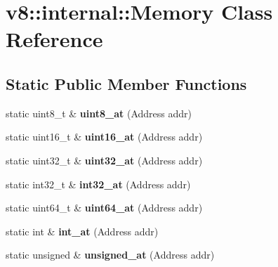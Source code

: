 \hypertarget{classv8_1_1internal_1_1_memory}{}\section{v8\+:\+:internal\+:\+:Memory Class Reference}
\label{classv8_1_1internal_1_1_memory}
\subsection*{Static Public Member Functions}
\begin{DoxyCompactItemize}
\item 
static uint8\+\_\+t \& {\bfseries uint8\+\_\+at} (Address addr)\hypertarget{classv8_1_1internal_1_1_memory_a22140801e40726e0a1765beb9c1b3718}{}\label{classv8_1_1internal_1_1_memory_a22140801e40726e0a1765beb9c1b3718}

\item 
static uint16\+\_\+t \& {\bfseries uint16\+\_\+at} (Address addr)\hypertarget{classv8_1_1internal_1_1_memory_a9a476e9ae1f102bec01a053fac6adce0}{}\label{classv8_1_1internal_1_1_memory_a9a476e9ae1f102bec01a053fac6adce0}

\item 
static uint32\+\_\+t \& {\bfseries uint32\+\_\+at} (Address addr)\hypertarget{classv8_1_1internal_1_1_memory_a38f6cdc22aa4642e967eb16d58452343}{}\label{classv8_1_1internal_1_1_memory_a38f6cdc22aa4642e967eb16d58452343}

\item 
static int32\+\_\+t \& {\bfseries int32\+\_\+at} (Address addr)\hypertarget{classv8_1_1internal_1_1_memory_afdb183a08970e652c8186765e89eef06}{}\label{classv8_1_1internal_1_1_memory_afdb183a08970e652c8186765e89eef06}

\item 
static uint64\+\_\+t \& {\bfseries uint64\+\_\+at} (Address addr)\hypertarget{classv8_1_1internal_1_1_memory_ada77135f011a8dc0d680ea42929c9789}{}\label{classv8_1_1internal_1_1_memory_ada77135f011a8dc0d680ea42929c9789}

\item 
static int \& {\bfseries int\+\_\+at} (Address addr)\hypertarget{classv8_1_1internal_1_1_memory_a35048f8d72f2fbac05c35365600213a4}{}\label{classv8_1_1internal_1_1_memory_a35048f8d72f2fbac05c35365600213a4}

\item 
static unsigned \& {\bfseries unsigned\+\_\+at} (Address addr)\hypertarget{classv8_1_1internal_1_1_memory_afc89afc8594f502862a1714da4775b62}{}\label{classv8_1_1internal_1_1_memory_afc89afc8594f502862a1714da4775b62}


\end{DoxyCompactItemize}
